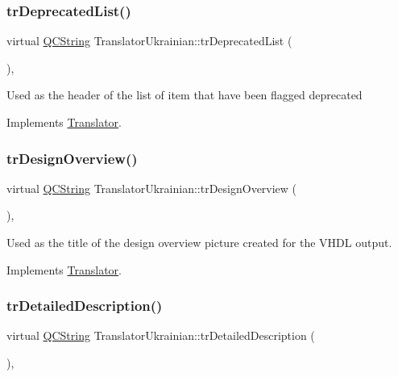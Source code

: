 \subsubsection{\texorpdfstring{trDeprecatedList()}{trDeprecatedList()}}
{\footnotesize\ttfamily virtual \mbox{\hyperlink{class_q_c_string}{Q\+C\+String}} Translator\+Ukrainian\+::tr\+Deprecated\+List (\begin{DoxyParamCaption}{ }\end{DoxyParamCaption})\hspace{0.3cm}{\ttfamily [inline]}, {\ttfamily [virtual]}}

Used as the header of the list of item that have been flagged deprecated 

Implements \mbox{\hyperlink{class_translator}{Translator}}.

\mbox{\label{class_translator_ukrainian_a2973da75e1865102a7420f1c13c38532}} 
\subsubsection{\texorpdfstring{trDesignOverview()}{trDesignOverview()}}
{\footnotesize\ttfamily virtual \mbox{\hyperlink{class_q_c_string}{Q\+C\+String}} Translator\+Ukrainian\+::tr\+Design\+Overview (\begin{DoxyParamCaption}{ }\end{DoxyParamCaption})\hspace{0.3cm}{\ttfamily [inline]}, {\ttfamily [virtual]}}

Used as the title of the design overview picture created for the V\+H\+DL output. 

Implements \mbox{\hyperlink{class_translator}{Translator}}.

\mbox{\label{class_translator_ukrainian_a52263b1b386dcec332bf028594d1ee84}} 
\subsubsection{\texorpdfstring{trDetailedDescription()}{trDetailedDescription()}}
{\footnotesize\ttfamily virtual \mbox{\hyperlink{class_q_c_string}{Q\+C\+String}} Translator\+Ukrainian\+::tr\+Detailed\+Description (\begin{DoxyParamCaption}{ }\end{DoxyParamCaption})\hspace{0.3cm}{\ttfamily [inline]}, {\ttfamily [virtual]}}

